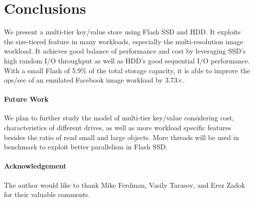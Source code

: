 \section{Conclusions}
\label{sec:conc}
We present a multi-tier key/value store using Flash SSD and HDD. It
exploits the size-tiered feature in many workloads, especially the
multi-resolution image workload. It achieves good balance of
performance and cost by leveraging SSD's high random I/O throughput as
well as HDD's good sequential I/O performance. With a small Flash of
5.9\% of the total storage capacity, it is able to improve the ops/sec
of an emulated Facebook image workload by 3.73$\times$.

\paragraph{Future Work}
We plan to further study the model of multi-tier key/value considering
cost, characteristics of different drives, as well as more workload
specific features besides the ratio of read small and large objects.
More threads will be used in benchmark to exploit better parallelism
in Flash SSD.

\paragraph{Acknowledgement}
The author would like to thank Mike Ferdman, Vasily Tarasov, and Erez
Zadok for their valuable comments.

